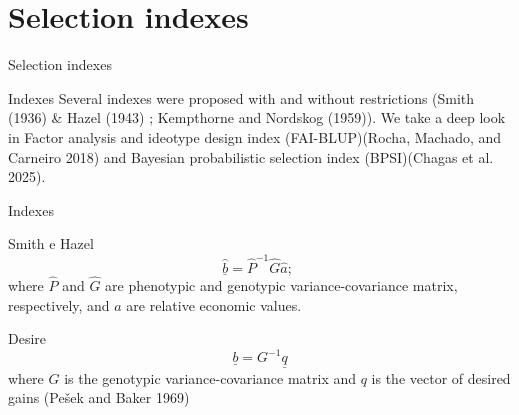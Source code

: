\documentclass[
  ignorenonframetext,
  aspectratio=169,
]{beamer}
\begin{document}
\section{Selection indexes}\label{selection-indexes}

\begin{frame}{Selection indexes}
\label{selection-indexes-1}
\begin{block}{Indexes}
\label{indexes}
Several indexes were proposed with and without restrictions (Smith
(1936) \& Hazel (1943) ; Kempthorne and Nordskog (1959)). We take a deep
look in Factor analysis and ideotype design index (FAI-BLUP)(Rocha,
Machado, and Carneiro 2018) and Bayesian probabilistic selection index
(BPSI)(Chagas et al. 2025).
\end{block}
\end{frame}

\begin{frame}{Indexes}
\label{indexes-1}
\begin{block}{Smith e Hazel}
\label{smith-e-hazel}
\[
\hat{\underline{b}} = \hat{P}^{-1} \hat{G} \hat{a};\;
\] where \(\hat{P}\) and \(\hat{G}\) are phenotypic and genotypic
variance-covariance matrix, respectively, and \(\hat{a}\) are relative
economic values.
\end{block}

\begin{block}{Desire}
\label{desire}
\[
\underline{b} = G^{-1} \underline{q}
\] where \(G\) is the genotypic variance-covariance matrix and \(q\) is
the vector of desired gains (Pešek and Baker 1969)
\end{block}
\end{frame}
\end{document}
